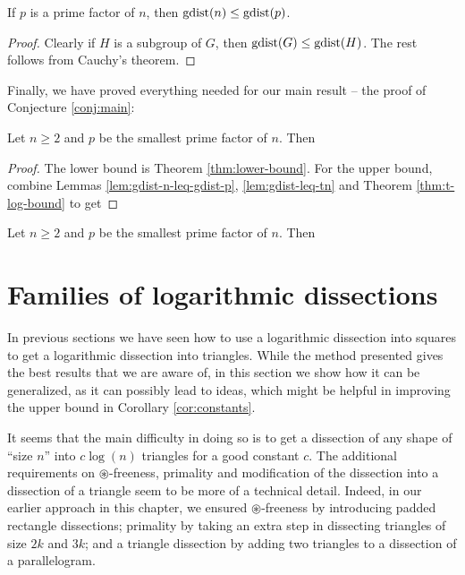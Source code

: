 \begin{lem}
\label{lem:gdist-n-leq-gdist-p}
If $p$ is a prime factor of $n$, then $\mathop{\mathrm{gdist}}(n) \leq \mathop{\mathrm{gdist}}(p)$.
\end{lem}%
\begin{proof}
Clearly if $H$ is a subgroup of $G$, then $\mathop{\mathrm{gdist}}(G) \leq \mathop{\mathrm{gdist}}(H)$. The rest follows from Cauchy's theorem.
\end{proof}

Finally, we have proved everything needed for our main result -- the proof of Conjecture \ref{conj:main}:

\begin{thm}
\label{cor:conj-proof}
Let $n \geq 2$ and $p$ be the smallest prime factor of $n$. Then
\end{thm}%
\begin{proof}
The lower bound is Theorem \ref{thm:lower-bound}. For the upper bound, combine Lemmas \ref{lem:gdist-n-leq-gdist-p}, \ref{lem:gdist-leq-tn} and Theorem \ref{thm:t-log-bound} to get
\end{proof}

\begin{cor}
\label{cor:constants}
Let $n \geq 2$ and $p$ be the smallest prime factor of $n$. Then
\end{cor}%

\section{Families of logarithmic dissections}
\label{sec:other-log-dissections}

In previous sections we have seen how to use a logarithmic dissection into squares to get a logarithmic dissection into triangles. While the method presented gives the best results that we are aware of, in this section we show how it can be generalized, as it can possibly lead to ideas, which might be helpful in improving the upper bound in Corollary \ref{cor:constants}.

It seems that the main difficulty in doing so is to get a dissection of any shape of ``size $n$'' into $c \log(n)$ triangles for a good constant $c$. The additional requirements on $\circledast$-freeness, primality and modification of the dissection into a dissection of a triangle seem to be more of a technical detail. Indeed, in our earlier approach in this chapter, we ensured $\circledast$-freeness by introducing padded rectangle dissections; primality by taking an extra step in dissecting triangles of size $2k$ and $3k$; and a triangle dissection by adding two triangles to a dissection of a parallelogram.

